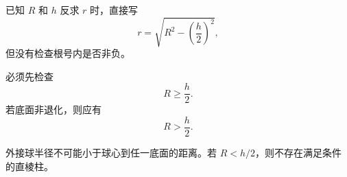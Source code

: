 \begin{trapbox}
	\medskip
	\begin{description}[style=nextline, leftmargin=2.8em, labelsep=0.5em, itemsep=0.35em]
		\item[\textbf{\textcolor{CTrap}{易错点四（反求参数不检查）}}] 已知 $R$ 和 $h$ 反求 $r$ 时，直接写
		      \[
			      r=\sqrt{R^2-\left(\frac{h}{2}\right)^2},
		      \]
		      但没有检查根号内是否非负。
		\item[\textbf{\textcolor{CTrap}{正确理解（先检查存在性）}}] 必须先检查
		      \[
			      R\geq \frac{h}{2}.
		      \]
		      若底面非退化，则应有
		      \[
			      R>\frac{h}{2}.
		      \]
		\item[\textbf{\textcolor{CTrap}{错因分析（忽略几何约束）}}] 外接球半径不可能小于球心到任一底面的距离。若 $R<h/2$，则不存在满足条件的直棱柱。
	\end{description}
\end{trapbox}